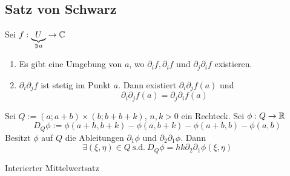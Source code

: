 \subsection{Satz von Schwarz}
\begin{Sat}
  Sei $f:\underbrace{U}_{\ni a}\to\mathbb{C}$
  \begin{enumerate}
    \item Es gibt eine Umgebung von $a$, wo $\partial_if,\partial_if$ und $\partial_j\partial_if$ existieren.
    \item $\partial_i\partial_jf$ ist stetig im Punkt $a$. Dann existiert $\partial_i\partial_jf(a)$ und
      \[\partial_i\partial_jf(a)=\partial_j\partial_if(a)\]
  \end{enumerate}
\end{Sat}
\begin{Lem}
  Sei $Q:=(a;a+b)\times (b;b+b+k)$, $n,k>0$ ein Rechteck. Sei $\phi:Q\to\mathbb{R}$
  \[D_Q\phi:=\phi(a+h,b+k)-\phi(a,b+k)-\phi(a+b,b)-\phi(a,b)\]
  Besitzt $\phi$ auf $Q$ die Ableitungen $\partial_1\phi$ und $\partial_2\partial_1\phi$. Dann
  \[\exists(\xi,\eta)\in Q\ \text{s.d.}\ D_Q\phi=hk\partial_2\partial_1\phi(\xi,\eta)\]
\end{Lem}
\begin{Bew}
  Interierter Mittelwertsatz
\end{Bew}
